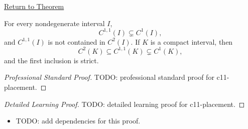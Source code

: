 \newpage
{}
\label{prf:c11-placement}

\begin{remark*}[Return]
\hyperref[thm:c11-placement]{Return to Theorem}
\end{remark*}

\begin{theorem*}[Placement of \(C^{1,1}\)]
For every nondegenerate interval \(I\),
\[
  C^{1,1}(I)\subsetneq C^1(I),
\]
and \(C^{1,1}(I)\) is not contained in \(C^2(I)\). If \(K\) is a compact
interval, then
\[
  C^2(K)\subseteq C^{1,1}(K)\subsetneq C^1(K),
\]
and the first inclusion is strict.
\end{theorem*}

\begin{proof}[Professional Standard Proof]
\LRAProofBodyStart
TODO: professional standard proof for c11-placement.
\end{proof}

\begin{proof}[Detailed Learning Proof]
\LRAProofBodyStart
TODO: detailed learning proof for c11-placement.
\end{proof}

\begin{remark*}
\end{remark*}

\begin{dependencies}
\begin{itemize}
  \item TODO: add dependencies for this proof.
\end{itemize}
\end{dependencies}

\clearpage
